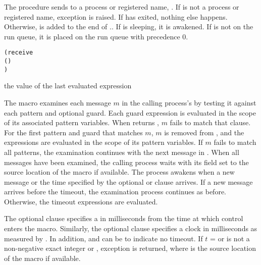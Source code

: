 \begin{procedure}
\end{procedure}
\returns{} 

The  procedure sends  to a process or
registered name, .  If  is not a
process or registered name, exception  is raised.  If  has exited,
nothing else happens.  Otherwise,  is added to the end of
..  If  is sleeping,
it is awakened.  If  is not on the run
queue, it is placed on the run queue with precedence
0.

\begin{syntax}
  \begin{alltt}
(receive
  (    \etc{})
  \etc{})\strut\end{alltt}
\end{syntax}
\returns{} the value of the last evaluated expression

The  macro examines each message $m$ in the calling
process's  by testing it against each pattern and
optional guard. Each guard expression  is evaluated in the
scope of its associated pattern variables.  When  returns
, $m$ fails to match that clause.  For the first pattern
and guard that matches $m$, $m$ is removed from , and
the expressions   \etc{} are evaluated in the scope of
its pattern variables.  If $m$ fails to match all patterns, the
examination continues with the next message in . When
all messages have been examined, the calling process waits with its
 field set to the source location of the 
macro if available. The process awakens when a new message or the time
specified by the optional  or  clause
arrives. If a new message arrives before the timeout, the examination
process continues as before. Otherwise, the timeout expressions
  \etc{} are evaluated.

The optional  clause specifies a  in
milliseconds from the time at which control enters the
 macro.  Similarly, the optional 
clause specifies a clock  in milliseconds as measured by
.  In addition,  and  can be
 to indicate no timeout. If $t$ =  or
 is not a non-negative exact integer or ,
exception  is returned, where
 is the source location of the  macro if
available.

